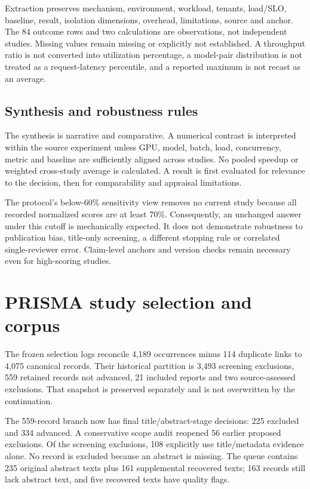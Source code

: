 Extraction preserves mechanism, environment, workload, tenants, load/SLO, baseline, result, isolation dimensions, overhead, limitations, source and anchor. The 84 outcome rows and two calculations are observations, not independent studies. Missing values remain missing or explicitly not established. A throughput ratio is not converted into utilization percentage, a model-pair distribution is not treated as a request-latency percentile, and a reported maximum is not recast as an average.

\subsection{Synthesis and robustness rules}
The synthesis is narrative and comparative. A numerical contrast is interpreted within the source experiment unless GPU, model, batch, load, concurrency, metric and baseline are sufficiently aligned across studies. No pooled speedup or weighted cross-study average is calculated. A result is first evaluated for relevance to the decision, then for comparability and appraisal limitations.

The protocol's below-60\% sensitivity view removes no current study because all recorded normalized scores are at least 70\%. Consequently, an unchanged answer under this cutoff is mechanically expected. It does not demonstrate robustness to publication bias, title-only screening, a different stopping rule or correlated single-reviewer error. Claim-level anchors and version checks remain necessary even for high-scoring studies.

\section{PRISMA study selection and corpus}
The frozen selection logs reconcile 4,189 occurrences minus 114 duplicate links to 4,075 canonical records. Their historical partition is 3,493 screening exclusions, 559 retained records not advanced, 21 included reports and two source-assessed exclusions. That snapshot is preserved separately and is not overwritten by the continuation.

The 559-record branch now has final title/abstract-stage decisions: 225 excluded and 334 advanced. A conservative scope audit reopened 56 earlier proposed exclusions. Of the screening exclusions, 108 explicitly use title/metadata evidence alone. No record is excluded because an abstract is missing. The queue contains 235 original abstract texts plus 161 supplemental recovered texts; 163 records still lack abstract text, and five recovered texts have quality flags.

